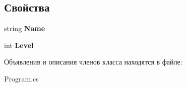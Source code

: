 \subsection*{Свойства}
\begin{DoxyCompactItemize}
\item 
\mbox{\label{class_hero_a62211b255b5024a0002e2d3c967b2eb5}} 
string {\bfseries Name}
\item 
\mbox{\label{class_hero_afd3f7dbef02fc8377d505d331bac884d}} 
int {\bfseries Level}
\end{DoxyCompactItemize}


Объявления и описания членов класса находятся в файле\+:\begin{DoxyCompactItemize}
\item 
Program.\+cs\end{DoxyCompactItemize}
